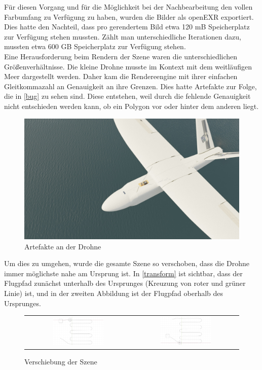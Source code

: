 Für diesen Vorgang und für die Möglichkeit bei der Nachbearbeitung den vollen Farbumfang zu Verfügung zu haben, wurden die Bilder als openEXR exportiert. Dies hatte den Nachteil, dass pro gerendertem Bild etwa 120 mB Speicherplatz zur Verfügung stehen mussten. Zählt man unterschiedliche Iterationen dazu, mussten etwa 600 GB Speicherplatz zur Verfügung stehen.\\
Eine Herausforderung beim Rendern der Szene waren die unterschiedlichen Größenverhältnisse. Die kleine Drohne musste im Kontext mit dem weitläufigen Meer dargestellt werden. Daher kam die Rendereengine mit ihrer einfachen Gleitkommazahl an Genauigkeit an ihre Grenzen. Dies hatte Artefakte zur Folge, die in \autoref{bug} zu sehen sind. Diese entstehen, weil durch die fehlende Genauigkeit nicht entschieden werden kann, ob ein Polygon vor oder hinter dem anderen liegt.

\begin{figure}[H]
\begin{center}
\includegraphics[width=\textwidth]{gfx/prod/plane/bug.jpg}
\caption{Artefakte an der Drohne}
\label{bug}
\end{center}
\end{figure}


Um dies zu umgehen, wurde die gesamte Szene so verschoben, dass die Drohne immer möglichste nahe am Ursprung ist. In \autoref{transform} ist sichtbar, dass der Flugpfad zunächst unterhalb des Ursprunges (Kreuzung von roter und grüner Linie) ist, und in der zweiten Abbildung ist der Flugpfad oberhalb des Ursprunges.

\begin{figure}[H]
\begin{tabular}{cc}
\includegraphics[width=0.5\textwidth]{gfx/prod/plane/flightpath1.jpg}&
\includegraphics[width=0.5\textwidth]{gfx/prod/plane/flightpath2.jpg}
\end{tabular}
\caption{Verschiebung der Szene}
\label{transform}
\end{figure}
